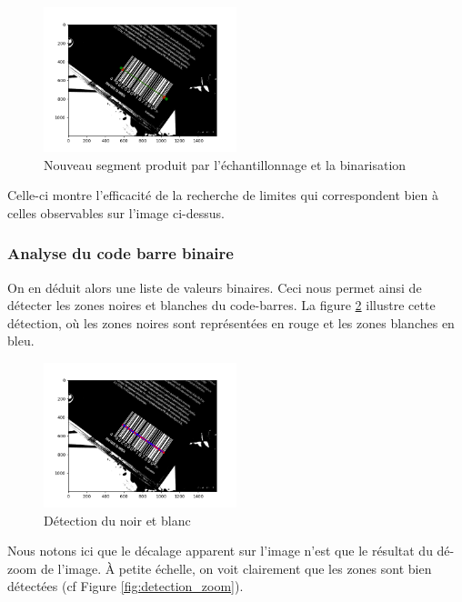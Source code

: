 \documentclass{rapport}
\begin{document}
\begin{figure}[H] 
	\centering
	\includegraphics[width=0.5\textwidth]{images/binarisation.png}
	\caption{Nouveau segment produit par l'échantillonnage et la binarisation}
	\label{fig:binarisation}
\end{figure}

Celle-ci montre l'efficacité de la recherche de limites qui correspondent bien à celles observables sur l'image ci-dessus.

\subsubsection*{Analyse du code barre binaire}

On en déduit alors une liste de valeurs binaires. Ceci nous permet ainsi de détecter les zones noires et blanches du code-barres. 
La figure \ref{fig:detection} illustre cette détection, où les zones noires sont représentées en rouge et les zones blanches en bleu.

\begin{figure}[H] 
	\centering
	\includegraphics[width=0.5\textwidth]{images/code_seuille_couleur.png}
	\caption{Détection du noir et blanc}
	\label{fig:detection}
\end{figure}

Nous notons ici que le décalage apparent sur l'image n'est que le résultat du dé-zoom de l'image.
À petite échelle, on voit clairement que les zones sont bien détectées (cf Figure \ref{fig:detection_zoom}). 
\end{document}
